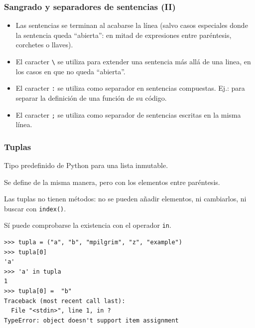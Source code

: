 \documentclass{beamer}
\begin{document}
\begin{frame}[fragile]
\frametitle{Sangrado y separadores de sentencias (II)}

\begin{itemize}
\item Las sentencias se terminan al acabarse la línea (salvo casos
  especiales donde la sentencia queda ``abierta'': en mitad de
  expresiones entre paréntesis, corchetes o llaves).
  
\item El caracter \verb|\| se utiliza para extender una sentencia más
  allá de una linea, en los casos en que no queda ``abierta''. 

\item El caracter \verb|:| se utiliza como separador en sentencias
  compuestas. Ej.: para separar la definición de una función de su
  código.
  
\item El caracter \verb|;| se utiliza como separador de sentencias
  escritas en la misma línea.

\end{itemize}
\end{frame}




\begin{frame}[fragile]
\frametitle{Tuplas}

Tipo predefinido de Python para una lista inmutable.

Se define de la misma manera, pero con los elementos entre paréntesis.

Las tuplas no tienen métodos: no se pueden añadir elementos, ni
cambiarlos, ni buscar con \verb|index()|.

Sí puede comprobarse la existencia con el operador \verb|in|.


\begin{footnotesize}
\begin{verbatim}
>>> tupla = ("a", "b", "mpilgrim", "z", "example") 
>>> tupla[0]                                       
'a'
>>> 'a' in tupla
1
>>> tupla[0] =  "b"
Traceback (most recent call last):
  File "<stdin>", line 1, in ?
TypeError: object doesn't support item assignment
\end{verbatim}
\end{footnotesize}

  
\end{frame}
\end{document}
